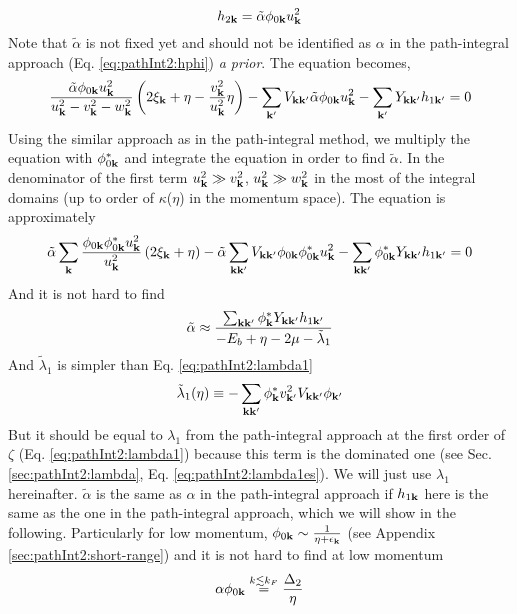 \begin{equation}\label{eq:meanfield:h2phi}
h_{2\mathbf{k}}=\tilde\alpha{}\phi_{0\mathbf{k}}u_{\mathbf{k}}^{2}
\end{equation}
Note that $\tilde\alpha$ is not fixed yet and should not be identified as $\alpha$ in the path-integral approach (Eq. \ref{eq:pathInt2:hphi}) \textit{a prior}. The equation becomes,
\begin{equation*}
\frac{\tilde\alpha{}\phi_{0\mathbf{k}}u_{\mathbf{k}}^{2} }{u^{2}_{\mathbf{k}}-v_{\mathbf{k}}^{2}-w_{\mathbf{k}}^{2}}\left(2 \xi_{\mathbf{k}}+\eta-\frac{v_{\mathbf{k}}^{2}}{u_{\mathbf{k}}^{2}}\eta\right)-\sum_{\mathbf{k}'}V_{\mathbf{k}\mathbf{k}'}\tilde\alpha{}\phi_{0\mathbf{k}}u_{\mathbf{k}}^{2}-\sum_{\mathbf{k}'}Y_{\mathbf{k}\mathbf{k}'}h_{1\mathbf{k}'}=0
\end{equation*}
Using the similar approach as in the path-integral method, we multiply the equation with $\phi_{0\mathbf{k}}^{*}$ and integrate the equation in order to find $\tilde{\alpha}$. In the denominator of the first term $u^{2}_{\mathbf{k}}\gg{}v_{\mathbf{k}}^{2}$, $u^{2}_{\mathbf{k}}\gg{}w_{\mathbf{k}}^{2}$ in the most of the integral domains (up to order of $\kappa$($\eta$) in the momentum space).  The equation is approximately 
\begin{equation*}
\tilde\alpha{}\sum_{\mathbf{k}}\frac{\phi_{0\mathbf{k}}\phi_{0\mathbf{k}}^{*}u_{\mathbf{k}}^{2}}{u^{2}_{\mathbf{k}}}\left(2 \xi_{\mathbf{k}}+\eta\right)-\tilde\alpha\sum_{\mathbf{k}\mathbf{k}'}V_{\mathbf{k}\mathbf{k}'}{}\phi_{0\mathbf{k}}\phi_{0\mathbf{k}}^{*}u_{\mathbf{k}}^{2}-\sum_{\mathbf{k}\mathbf{k}'}\phi_{0\mathbf{k}}^{*}Y_{\mathbf{k}\mathbf{k}'}h_{1\mathbf{k}'}=0
\end{equation*}
And it is not hard to find 
\begin{equation}
\tilde\alpha\approx\frac{\sum_{\mathbf{k}\mathbf{k}'}{\phi_{\mathbf{k}}^{*}}{Y_{\mathbf{k}\mathbf{k}'}}{h_{1\mathbf{k}'}}}{{-E_{b}+\eta-2\mu-\tilde\lambda_{1}}}
\end{equation}
 And $\tilde\lambda_{1}$ is simpler than Eq. \ref{eq:pathInt2:lambda1}
\begin{equation*}
\tilde\lambda_{1}(\eta)\equiv-\sum_{\mathbf{k}\mathbf{k}'}{\phi_{\mathbf{k}}^{*}}{v_{\mathbf{k}'}^{2}V_{\mathbf{k}\mathbf{k}'}}\phi_{\mathbf{k}'}
\end{equation*}
But it should be equal to $\lambda_{1}$ from the path-integral approach at the first order of $\zeta$ (Eq. \ref{eq:pathInt2:lambda1}) because this term is the dominated one (see Sec. \ref{sec:pathInt2:lambda}, Eq. \ref{eq:pathInt2:lambda1es}). We will just use $\lambda_{1}$ hereinafter. $\tilde\alpha$ is the same as $\alpha$ in the path-integral approach if $h_{1\mathbf{k}}$ here is the same as the one in the path-integral approach,  which we will show in the following. Particularly for low momentum, $\phi_{0\mathbf{k}}\sim\frac{1}{\eta+\epsilon_{\mathbf{k}}}$ (see Appendix \ref{sec:pathInt2:short-range}) and it is not hard to find at low momentum
\begin{equation}\label{eq:meanfield:aphi}
\alpha\phi_{0\mathbf{k}}\overset{{k\lesssim{k_F}}}{=}\frac{\Delta_2}{\eta}
\end{equation}

